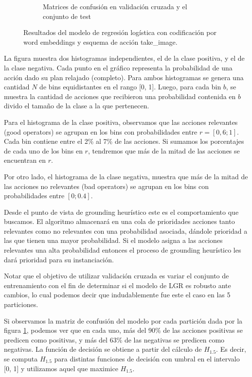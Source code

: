 \begin{figure}
\begin{subfigure}[b]{\textwidth}
    \endminipage
    \caption{Matrices de confusión en validación cruzada y el conjunto de test}
    \label{fig:takeimage-bestmodel-cm}
    \end{subfigure}
    \caption{Resultados del modelo de regresión logística con codificación por word embeddings y esquema de acción take\_image.}
    \label{fig:takeimage-bestmodel}
\end{figure}


La figura muestra dos histogramas independientes, el de la clase positiva, y el
de la clase negativa. Cada punto en el gráfico representa la probabilidad de una
acción dado su plan relajado (completo). Para ambos histogramas se genera una
cantidad $N$ de bins equidistantes en el rango [0, 1]. Luego, para cada bin $b$,
se muestra la cantidad de acciones que recibieron una probabilidad contenida en
$b$ divido el tamaño de la clase a la que pertenecen.

Para el histograma de la clase positiva, observamos que las acciones relevantes
(good operators) se agrupan en los bins con probabilidades entre $r=[0,6; 1]$.
Cada bin contiene entre el 2\% al 7\% de las acciones. Si sumamos los
porcentajes de cada uno de los bins en $r$, tendremos que más de la mitad de las
acciones se encuentran en $r$.

Por otro lado, el histograma de la clase negativa, muestra que más de la mitad
de las acciones no relevantes (bad operators) se agrupan en los bins con
probabilidades entre $[0;0.4]$.

Desde el punto de vista de grounding heurístico este es el comportamiento que
buscamos. El algoritmo almacenará en una cola de prioridades acciones tanto
relevantes como no relevantes con una probabilidad asociada, dándole prioridad a
las que tienen una mayor probabilidad. Si el modelo asigna a las acciones
relevantes una alta probabilidad entonces el proceso de grounding heurístico les
dará prioridad para su instanciación.

Notar que el objetivo de utilizar validación cruzada es variar el conjunto de
entrenamiento con el fin de determinar si el modelo de LGR es robusto ante
cambios, lo cual podemos decir que indudablemente fue este el caso en las 5
particiones.

Si observamos la matriz de confusión del modelo por cada partición dada por la
figura \ref{fig:takeimage-bestmodel-cm}, podemos ver que en cada uno, más del
90\% de las acciones positivas se predicen como positivas, y más del 63\% de las
negativas se predicen como negativas. La función de decisión se obtiene a partir
del cálculo de $H_{1.5}$. Es decir, se computa $H_{1.5}$ para distintas
funciones de decisión con umbral en el intervalo [0, 1] y utilizamos aquel que
maximice $H_{1.5}$. 

